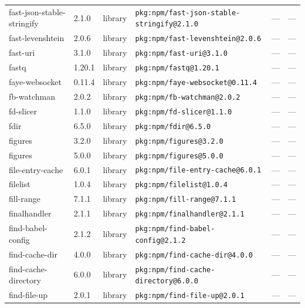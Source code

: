 \documentclass[11pt,a4paper]{article}
\begin{document}
\begin{longtable}{|p{4cm}|p{2cm}|p{1.6cm}|p{5cm}|p{1.5cm}|p{3.5cm}|}
\raggedright fast-json-stable-stringify & 2.1.0 & library & \small\texttt{pkg:npm/fast-json-stable-stringify@2.1.0} & — & \small — \\
\raggedright fast-levenshtein & 2.0.6 & library & \small\texttt{pkg:npm/fast-levenshtein@2.0.6} & — & \small — \\
\raggedright fast-uri & 3.1.0 & library & \small\texttt{pkg:npm/fast-uri@3.1.0} & — & \small — \\
\raggedright fastq & 1.20.1 & library & \small\texttt{pkg:npm/fastq@1.20.1} & — & \small — \\
\raggedright faye-websocket & 0.11.4 & library & \small\texttt{pkg:npm/faye-websocket@0.11.4} & — & \small — \\
\raggedright fb-watchman & 2.0.2 & library & \small\texttt{pkg:npm/fb-watchman@2.0.2} & — & \small — \\
\raggedright fd-slicer & 1.1.0 & library & \small\texttt{pkg:npm/fd-slicer@1.1.0} & — & \small — \\
\raggedright fdir & 6.5.0 & library & \small\texttt{pkg:npm/fdir@6.5.0} & — & \small — \\
\raggedright figures & 3.2.0 & library & \small\texttt{pkg:npm/figures@3.2.0} & — & \small — \\
\raggedright figures & 5.0.0 & library & \small\texttt{pkg:npm/figures@5.0.0} & — & \small — \\
\raggedright file-entry-cache & 6.0.1 & library & \small\texttt{pkg:npm/file-entry-cache@6.0.1} & — & \small — \\
\raggedright filelist & 1.0.4 & library & \small\texttt{pkg:npm/filelist@1.0.4} & — & \small — \\
\raggedright fill-range & 7.1.1 & library & \small\texttt{pkg:npm/fill-range@7.1.1} & — & \small — \\
\raggedright finalhandler & 2.1.1 & library & \small\texttt{pkg:npm/finalhandler@2.1.1} & — & \small — \\
\raggedright find-babel-config & 2.1.2 & library & \small\texttt{pkg:npm/find-babel-config@2.1.2} & — & \small — \\
\raggedright find-cache-dir & 4.0.0 & library & \small\texttt{pkg:npm/find-cache-dir@4.0.0} & — & \small — \\
\raggedright find-cache-directory & 6.0.0 & library & \small\texttt{pkg:npm/find-cache-directory@6.0.0} & — & \small — \\
\raggedright find-file-up & 2.0.1 & library & \small\texttt{pkg:npm/find-file-up@2.0.1} & — & \small — \\

\end{longtable}
\end{document}
